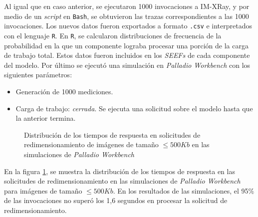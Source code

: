 Al igual que en caso anterior, se ejecutaron 1000 invocaciones a IM-XRay, y por medio de un \emph{script} en \texttt{Bash}, se obtuvieron las trazas correspondientes a las 1000 invocaciones. Los nuevos datos fueron exportados a formato \texttt{.csv} e interpretados con el lenguaje \texttt{R}. En \texttt{R}, se calcularon distribuciones de frecuencia de la probabilidad en la que un componente lograba procesar una porción de la carga de trabajo total. Estos datos fueron incluidos en los \emph{SEEFs} de cada componente del modelo. Por último se ejecutó una simulación en \emph{Palladio Workbench} con los siguientes parámetros:
\begin{itemize}
    \item Generación de 1000 mediciones.
    \item Carga de trabajo: \emph{cerrada}. Se ejecuta una solicitud sobre el modelo hasta que la anterior termina. 
\end{itemize}

\begin{figure}[h]
\hspace{-2.0cm}
\caption{Distribución de los tiempos de respuesta en solicitudes de redimensionamiento de imágenes de tamaño $\leq 500Kb$ en las simulaciones de \emph{Palladio Workbench}}
\label{fig:distribucion-simulacion-imagenes-hasta-500kb}
\end{figure}

En la figura \ref{fig:distribucion-simulacion-imagenes-hasta-500kb}, se muestra la distribución de los tiempos de respuesta en las solicitudes de redimensionamiento en las simulaciones de \emph{Palladio Workbench} para imágenes de tamaño $\leq 500Kb$. En los resultados de las simulaciones, el 95\% de las invocaciones no superó los 1,6 segundos en procesar la solicitud de redimensionamiento.

